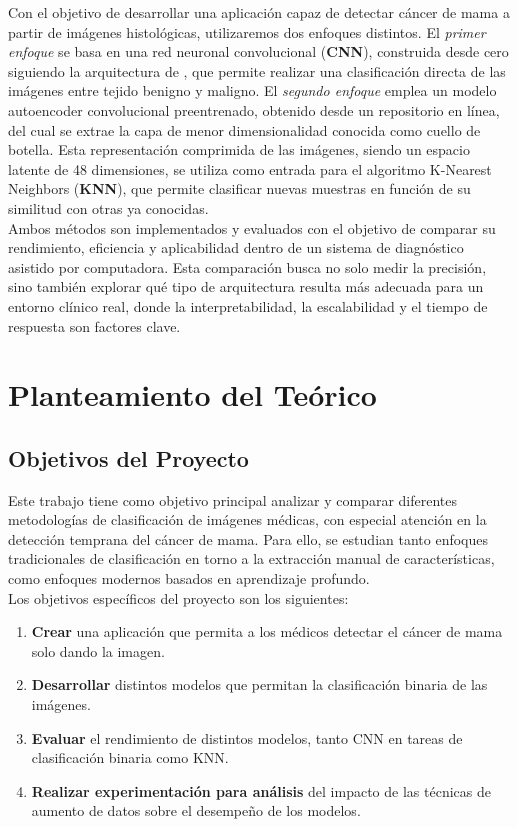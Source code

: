 \documentclass[12pt]{article} %
\begin{document}
Con el objetivo de desarrollar una aplicación capaz de detectar cáncer de mama a partir de imágenes histológicas, utilizaremos dos enfoques distintos. El \textit{primer enfoque} se basa en una red neuronal convolucional (\textbf{CNN}), construida desde cero siguiendo la arquitectura de \cite{bardou2018classification}, que permite realizar una clasificación directa de las imágenes entre tejido benigno y maligno. El \textit{segundo enfoque} emplea un modelo autoencoder convolucional preentrenado, obtenido desde un repositorio en línea, del cual se extrae la capa de menor dimensionalidad conocida como cuello de botella. Esta representación comprimida de las imágenes, siendo un espacio latente de 48 dimensiones, se utiliza como entrada para el algoritmo K-Nearest Neighbors (\textbf{KNN}), que permite clasificar nuevas muestras en función de su similitud con otras ya conocidas.\\

Ambos métodos son implementados y evaluados con el objetivo de comparar su rendimiento, eficiencia y aplicabilidad dentro de un sistema de diagnóstico asistido por computadora. Esta comparación busca no solo medir la precisión, sino también explorar qué tipo de arquitectura resulta más adecuada para un entorno clínico real, donde la interpretabilidad, la escalabilidad y el tiempo de respuesta son factores clave.
\\
\section{Planteamiento del Teórico}
\subsection{Objetivos del Proyecto}

Este trabajo tiene como objetivo principal analizar y comparar diferentes metodologías de clasificación de imágenes médicas, con especial atención en la detección temprana del cáncer de mama. Para ello, se estudian tanto enfoques tradicionales de clasificación en torno a la extracción manual de características, como enfoques modernos basados en aprendizaje profundo.\\

Los objetivos específicos del proyecto son los siguientes:\\

\begin{enumerate}
    \item \textbf{Crear} una aplicación que permita a los médicos detectar el cáncer de mama solo dando la imagen.
    \item \textbf{Desarrollar} distintos modelos que permitan la clasificación binaria de las imágenes.
    \item \textbf{Evaluar} el rendimiento de distintos modelos, tanto CNN en tareas de clasificación binaria como KNN.
    \item \textbf{Realizar experimentación para análisis} del  impacto de las técnicas de aumento de datos sobre el desempeño de los modelos.
\end{enumerate}
\end{document}
